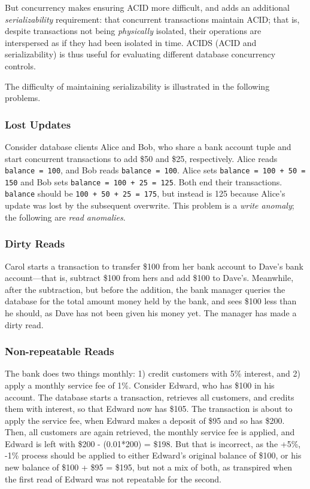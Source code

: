 \documentclass[12pt]{article} %
\begin{document}
But concurrency makes ensuring ACID more difficult, and adds an additional \textit{serializability} requirement: that concurrent transactions maintain ACID; that is, despite transactions not being \textit{physically} isolated, their operations are interspersed as if they had been isolated in time. ACIDS (ACID and serializability) is thus useful for evaluating different database concurrency controls.

The difficulty of maintaining serializability is illustrated in the following problems.

\subsubsection{Lost Updates}

Consider database clients Alice and Bob, who share a bank account tuple and start concurrent transactions to add \$50 and \$25, respectively. Alice reads \texttt{balance = 100}, and Bob reads \texttt{balance = 100}. Alice sets \texttt{balance = 100 + 50 = 150} and Bob sets \texttt{balance = 100 + 25 = 125}. Both end their transactions. \texttt{balance} should be \texttt{100 + 50 + 25 = 175}, but instead is 125 because Alice's update was lost by the subsequent overwrite. This problem is a \textit{write anomaly}; the following are \textit{read anomalies}.

\subsubsection{Dirty Reads}
Carol starts a transaction to transfer \$100 from her bank account to Dave's bank account---that is, subtract \$100 from hers and add \$100 to Dave's. Meanwhile, after the subtraction, but before the addition, the bank manager queries the database for the total amount money held by the bank, and sees \$100 less than he should, as Dave has not been given his money yet. The manager has made a dirty read.

\subsubsection{Non-repeatable Reads}
The bank does two things monthly: 1) credit customers with 5\% interest, and 2) apply a monthly service fee of 1\%. Consider Edward, who has \$100 in his account. The database starts a transaction, retrieves all customers, and credits them with interest, so that Edward now has \$105. The transaction is about to apply the service fee, when Edward makes a deposit of \$95 and so has \$200. Then, all customers are again retrieved, the monthly service fee is applied, and Edward is left with \$200 - (0.01*200) = \$198. But that is incorrect, as the +5\%, -1\% process should be applied to either Edward's original balance of \$100, or his new balance of \$100 + \$95 = \$195, but not a mix of both, as transpired when the first read of Edward was not repeatable for the second.
\end{document}
